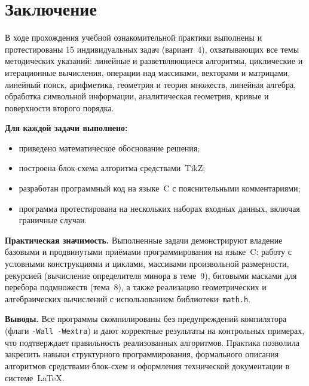 \section{Заключение}

В ходе прохождения учебной ознакомительной практики выполнены
и протестированы 15 индивидуальных задач (вариант~4), охватывающих
все темы методических указаний: линейные и разветвляющиеся
алгоритмы, циклические и итерационные вычисления, операции над
массивами, векторами и матрицами, линейный поиск, арифметика,
геометрия и теория множеств, линейная алгебра, обработка
символьной информации, аналитическая геометрия, кривые и
поверхности второго порядка.

\medskip
\noindent\textbf{Для каждой задачи выполнено:}
\begin{itemize}
  \item приведено математическое обоснование решения;
  \item построена блок-схема алгоритма средствами~TikZ;
  \item разработан программный код на языке~C с пояснительными
        комментариями;
  \item программа протестирована на нескольких наборах входных
        данных, включая граничные случаи.
\end{itemize}

\medskip
\noindent\textbf{Практическая значимость.} Выполненные задачи
демонстрируют владение базовыми и продвинутыми приёмами
программирования на языке~C: работу с условными конструкциями
и циклами, массивами произвольной размерности, рекурсией
(вычисление определителя минора в теме~9), битовыми масками
для перебора подмножеств (тема~8), а также реализацию
геометрических и алгебраических вычислений с использованием
библиотеки~\texttt{math.h}.

\medskip
\noindent\textbf{Выводы.} Все программы скомпилированы без
предупреждений компилятора (флаги \texttt{-Wall~-Wextra}) и дают
корректные результаты на контрольных примерах, что подтверждает
правильность реализованных алгоритмов. Практика позволила закрепить
навыки структурного программирования, формального описания
алгоритмов средствами блок-схем и оформления технической
документации в системе~\LaTeX{}.
